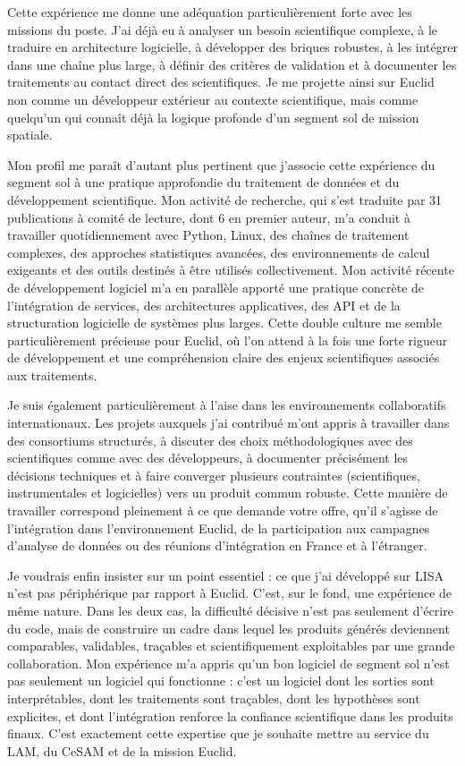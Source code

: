 \documentclass[11pt,a4paper]{altacv}
\begin{document}
{{{{Cette expérience me donne une adéquation particulièrement forte avec les missions du poste. J'ai déjà eu à analyser un besoin scientifique complexe, à le traduire en architecture logicielle, à développer des briques robustes, à les intégrer dans une chaîne plus large, à définir des critères de validation et à documenter les traitements au contact direct des scientifiques. Je me projette ainsi sur Euclid non comme un développeur extérieur au contexte scientifique, mais comme quelqu'un qui connaît déjà la logique profonde d'un segment sol de mission spatiale.

Mon profil me paraît d'autant plus pertinent que j'associe cette expérience du segment sol à une pratique approfondie du traitement de données et du développement scientifique. Mon activité de recherche, qui s'est traduite par 31 publications à comité de lecture, dont 6 en premier auteur, m'a conduit à travailler quotidiennement avec Python, Linux, des chaînes de traitement complexes, des approches statistiques avancées, des environnements de calcul exigeants et des outils destinés à être utilisés collectivement. Mon activité récente de développement logiciel m'a en parallèle apporté une pratique concrète de l'intégration de services, des architectures applicatives, des API et de la structuration logicielle de systèmes plus larges. Cette double culture me semble particulièrement précieuse pour Euclid, où l'on attend à la fois une forte rigueur de développement et une compréhension claire des enjeux scientifiques associés aux traitements.


Je suis également particulièrement à l'aise dans les environnements collaboratifs internationaux. Les projets auxquels j'ai contribué m'ont appris à travailler dans des consortiums structurés, à discuter des choix méthodologiques avec des scientifiques comme avec des développeurs, à documenter précisément les décisions techniques et à faire converger plusieurs contraintes (scientifiques, instrumentales et logicielles)
vers un produit commun robuste. Cette manière de travailler correspond pleinement à ce que demande votre offre, qu'il s'agisse de l'intégration dans l'environnement Euclid, de la participation aux campagnes d'analyse de données ou des réunions d'intégration en France et à l'étranger.


Je voudrais enfin insister sur un point essentiel : ce que j'ai développé sur LISA n'est pas périphérique par rapport à Euclid. C'est, sur le fond, une expérience de même nature. Dans les deux cas, la difficulté décisive n'est pas seulement d'écrire du code, mais de construire un cadre dans lequel les produits générés deviennent comparables, validables, traçables et scientifiquement exploitables par une grande collaboration. Mon expérience m'a appris qu'un bon logiciel de segment sol n'est pas seulement un logiciel qui fonctionne : c'est un logiciel dont les sorties sont interprétables, dont les traitements sont traçables, dont les hypothèses sont explicites, et dont l'intégration renforce la confiance scientifique dans les produits finaux. C'est exactement cette expertise que je souhaite mettre au service du LAM, du CeSAM et de la mission Euclid.

}}}}
\end{document}
